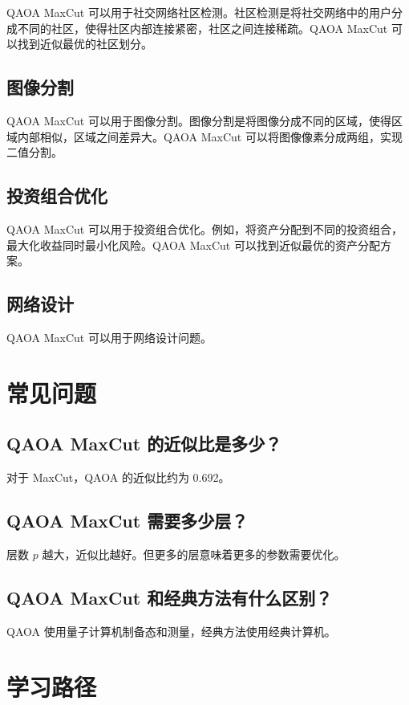 \documentclass[12pt,a4paper]{article}
\begin{document}
QAOA MaxCut 可以用于社交网络社区检测。社区检测是将社交网络中的用户分成不同的社区，使得社区内部连接紧密，社区之间连接稀疏。QAOA MaxCut 可以找到近似最优的社区划分。

\subsection{图像分割}

QAOA MaxCut 可以用于图像分割。图像分割是将图像分成不同的区域，使得区域内部相似，区域之间差异大。QAOA MaxCut 可以将图像像素分成两组，实现二值分割。

\subsection{投资组合优化}

QAOA MaxCut 可以用于投资组合优化。例如，将资产分配到不同的投资组合，最大化收益同时最小化风险。QAOA MaxCut 可以找到近似最优的资产分配方案。

\subsection{网络设计}

QAOA MaxCut 可以用于网络设计问题。

\section{常见问题}

\subsection{QAOA MaxCut 的近似比是多少？}

对于 MaxCut，QAOA 的近似比约为 0.692。

\subsection{QAOA MaxCut 需要多少层？}

层数 $p$ 越大，近似比越好。但更多的层意味着更多的参数需要优化。

\subsection{QAOA MaxCut 和经典方法有什么区别？}

QAOA 使用量子计算机制备态和测量，经典方法使用经典计算机。

\section{学习路径}
\end{document}
